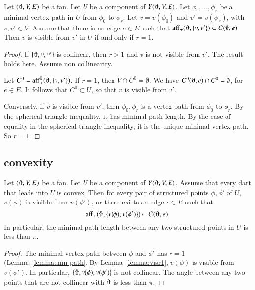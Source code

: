 \begin{lemma}  
Let $(\orgn,V,E)$ be a fan. Let $U$ be a component of $Y(\orgn,V,E)$.  Let $\phi_0,\ldots,\phi_r$ be a minimal vertex path in $U$ from $\phi_0$ to $\phi_r$.  Let $v=v(\phi_0)$ and $v'=v(\phi_r)$, with $v,v'\in V$.  Assume that there is no edge $e\in E$ such that $\op{aff}_+(\orgn,\{v,v'\})\subset C(\orgn,e)$.
Then $v$ is visible from $v'$ in $U$ if and only if $r=1$. 
\end{lemma}

\begin{proof}
If $\{\orgn,v,v'\}$ is collinear, then $r>1$ and $v$ is not visible from $v'$.  The result holds here.  Assume non collinearity.  

Let $C^0 = \op{aff}_+^0(\orgn,\{v,v'\})$.  If $r=1$, then
$V\cap C^0 = \emptyset$.  We have
$C^0(\orgn,e)\cap C^0 = \emptyset$, for $e\in E$.  It follows that
$C^0\subset U$, so that $v$ is visible from $v'$.

Conversely, if $v$ is visible from $v'$, then $\phi_0,\phi_r$ is a vertex path from $\phi_0$ to $\phi_r$.  By the spherical triangle inequality, it has minimal path-length.  By the case of equality in the spherical triangle inequality, it is the unique minimal vertex path.  So $r=1$.
\end{proof}

\subsection{convexity}


\begin{lemma}
Let $(\orgn,V,E)$ be a fan.  Let $U$ be a component of $Y(\orgn,V,E)$.
Assume that every dart that leads into $U$ is convex.  Then
 for every pair of structured points $\phi,\phi'$ of $U$, 
$v(\phi)$ is visible from $v(\phi')$, or there exists an edge
$e\in E$ such that 
  $$\op{aff}_+(\orgn,\{v(\phi),v(\phi')\})\subset C(\orgn,e).$$
In particular, the minimal path-length between any
two structured points in $U$ is less than $\pi$. 
\end{lemma}

\begin{proof}  The minimal vertex path between $\phi$ and $\phi'$ has $r=1$ (Lemma~\ref{lemma:min-path}.
By Lemma~\ref{lemma:visr1}, $v(\phi)$ is visible from $v(\phi')$.  
In particular, $\{\orgn,v(\phi),v(\phi')\}$ is not collinear.
The angle between any two points that are not collinear with $\orgn$ is less than $\pi$. 
\end{proof}

